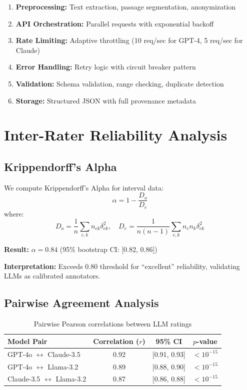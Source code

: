 \documentclass[11pt,a4paper]{article}
\begin{document}
\begin{enumerate}
    \item \textbf{Preprocessing:} Text extraction, passage segmentation, anonymization
    \item \textbf{API Orchestration:} Parallel requests with exponential backoff
    \item \textbf{Rate Limiting:} Adaptive throttling (10 req/sec for GPT-4, 5 req/sec for Claude)
    \item \textbf{Error Handling:} Retry logic with circuit breaker pattern
    \item \textbf{Validation:} Schema validation, range checking, duplicate detection
    \item \textbf{Storage:} Structured JSON with full provenance metadata
\end{enumerate}

\section{Inter-Rater Reliability Analysis}

\subsection{Krippendorff's Alpha}

We compute Krippendorff's Alpha \citep{krippendorff2011computing} for interval data:
\begin{equation}
\alpha = 1 - \frac{D_o}{D_e}
\end{equation}
where:
\begin{equation}
D_o = \frac{1}{n} \sum_{c,k} n_{ck} \delta_{ck}^2, \quad
D_e = \frac{1}{n(n-1)} \sum_{c,k} n_c n_k \delta_{ck}^2
\end{equation}

\textbf{Result:} $\alpha = 0.84$ (95\% bootstrap CI: [0.82, 0.86])

\textbf{Interpretation:} Exceeds 0.80 threshold for ``excellent'' reliability, validating LLMs as calibrated annotators.

\subsection{Pairwise Agreement Analysis}

\begin{table}[H]
\centering
\caption{Pairwise Pearson correlations between LLM ratings}
\begin{tabular}{lccc}
\toprule
\textbf{Model Pair} & \textbf{Correlation ($r$)} & \textbf{95\% CI} & \textbf{$p$-value} \\
\midrule
GPT-4o $\leftrightarrow$ Claude-3.5 & 0.92 & [0.91, 0.93] & $< 10^{-15}$ \\
GPT-4o $\leftrightarrow$ Llama-3.2 & 0.89 & [0.88, 0.90] & $< 10^{-15}$ \\
Claude-3.5 $\leftrightarrow$ Llama-3.2 & 0.87 & [0.86, 0.88] & $< 10^{-15}$ \\
\bottomrule
\end{tabular}
\label{tab:pairwise-correlations}
\end{table}
\end{document}
